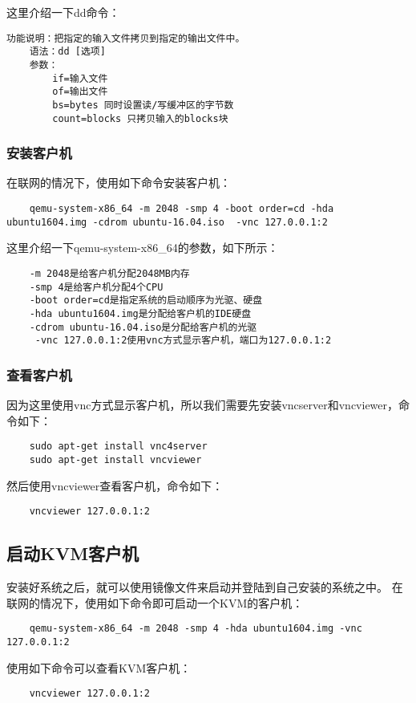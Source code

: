 \documentclass[a4paper,left=2.5cm,right=2.5cm,11pt]{article}
\begin{document}
	这里介绍一下dd命令：
	\begin{lstlisting}[numberstyle = \color{white}]
	功能说明：把指定的输入文件拷贝到指定的输出文件中。
	语法：dd [选项]
	参数：
		if=输入文件
		of=输出文件
		bs=bytes 同时设置读/写缓冲区的字节数
		count=blocks 只拷贝输入的blocks块
	\end{lstlisting}

\subsubsection{安装客户机}
	在联网的情况下，使用如下命令安装客户机：
	\begin{lstlisting}
	qemu-system-x86_64 -m 2048 -smp 4 -boot order=cd -hda ubuntu1604.img -cdrom ubuntu-16.04.iso  -vnc 127.0.0.1:2
	\end{lstlisting}

	这里介绍一下qemu-system-x86\_64的参数，如下所示：
	\begin{lstlisting}
	-m 2048是给客户机分配2048MB内存
	-smp 4是给客户机分配4个CPU
	-boot order=cd是指定系统的启动顺序为光驱、硬盘
	-hda ubuntu1604.img是分配给客户机的IDE硬盘
	-cdrom ubuntu-16.04.iso是分配给客户机的光驱
	 -vnc 127.0.0.1:2使用vnc方式显示客户机，端口为127.0.0.1:2
	\end{lstlisting}

\subsubsection{查看客户机}
	因为这里使用vnc方式显示客户机，所以我们需要先安装vncserver和vncviewer，命令如下：
	\begin{lstlisting}
	sudo apt-get install vnc4server
	sudo apt-get install vncviewer
	\end{lstlisting}

	然后使用vncviewer查看客户机，命令如下：
	\begin{lstlisting}
	vncviewer 127.0.0.1:2
	\end{lstlisting}

\subsection{启动KVM客户机}
	安装好系统之后，就可以使用镜像文件来启动并登陆到自己安装的系统之中。
	在联网的情况下，使用如下命令即可启动一个KVM的客户机：
	\begin{lstlisting}
	qemu-system-x86_64 -m 2048 -smp 4 -hda ubuntu1604.img -vnc 127.0.0.1:2
	\end{lstlisting}

	使用如下命令可以查看KVM客户机：
	\begin{lstlisting}
	vncviewer 127.0.0.1:2
	\end{lstlisting}
\end{document}
